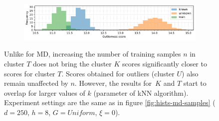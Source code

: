 \begin{figure}[t]
\begin{subfigure}[b]{\textwidth}
        \includegraphics[width=\textwidth]{images/distributions/hists-knn-samples/hist-distributions-dimension_250-samples_1000-distance_8-distribution_uniform-model_kNN-20-seed_0.pdf}
        \label{fig:hists-knn20-1000}
    \end{subfigure}
    \caption{Unlike for MD, increasing the number of training samples $n$ in cluster $T$ does not bring the cluster $K$ scores significantly closer to scores for cluster $T$. Scores obtained for outliers (cluster $U$) also remain unaffected by $n$. However, the results for~$K$ and $T$ start to overlap for larger values of $k$ (parameter of kNN algorithm). Experiment settings are the same as in figure \ref{fig:hists-md-samples} ({\small$d = 250$, $h = 8$, $G = \textit{Uniform}$, $\xi = 0$}).}
    \label{fig:hists-knn-samples}
\end{figure}

